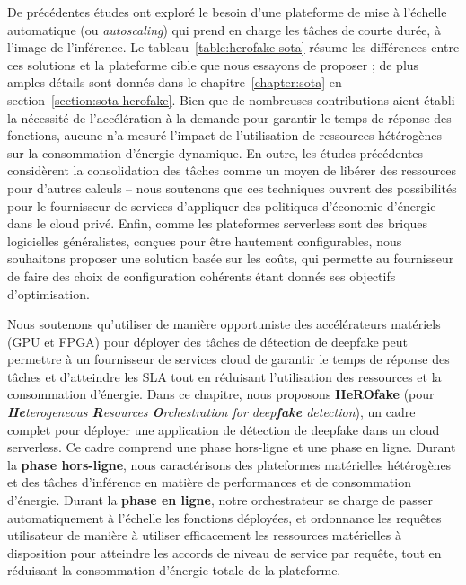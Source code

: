 De précédentes études ont exploré le besoin d'une plateforme de mise à l'échelle automatique (ou \textit{autoscaling}) qui prend en charge les tâches de courte durée, à l'image de l'inférence. Le tableau~\ref{table:herofake-sota} résume les différences entre ces solutions et la plateforme cible que nous essayons de proposer ; de plus amples détails sont donnés dans le chapitre~\ref{chapter:sota} en section~\ref{section:sota-herofake}. Bien que de nombreuses contributions aient établi la nécessité de l'accélération à la demande pour garantir le temps de réponse des fonctions, aucune n'a mesuré l'impact de l'utilisation de ressources hétérogènes sur la consommation d'énergie dynamique. En outre, les études précédentes considèrent la consolidation des tâches comme un moyen de libérer des ressources pour d'autres calculs -- nous soutenons que ces techniques ouvrent des possibilités pour le fournisseur de services d'appliquer des politiques d'économie d'énergie dans le cloud privé. Enfin, comme les plateformes serverless sont des briques logicielles généralistes, conçues pour être hautement configurables, nous souhaitons proposer une solution basée sur les coûts, qui permette au fournisseur de faire des choix de configuration cohérents étant donnés ses objectifs d'optimisation.

Nous soutenons qu'utiliser de manière opportuniste des accélérateurs matériels (GPU et FPGA) pour déployer des tâches de détection de deepfake peut permettre à un fournisseur de services cloud de garantir le temps de réponse des tâches et d'atteindre les SLA tout en réduisant l'utilisation des ressources et la consommation d'énergie. Dans ce chapitre, nous proposons \textbf{HeROfake} (pour \textit{\textbf{He}terogeneous \textbf{R}esources \textbf{O}rchestration for deep\textbf{fake} detection}), un cadre complet pour déployer une application de détection de deepfake dans un cloud serverless. Ce cadre comprend une phase hors-ligne et une phase en ligne. Durant la \textbf{phase hors-ligne}, nous caractérisons des plateformes matérielles hétérogènes et des tâches d'inférence en matière de performances et de consommation d'énergie. Durant la \textbf{phase en ligne}, notre orchestrateur se charge de passer automatiquement à l'échelle les fonctions déployées, et ordonnance les requêtes utilisateur de manière à utiliser efficacement les ressources matérielles à disposition pour atteindre les accords de niveau de service par requête, tout en réduisant la consommation d'énergie totale de la plateforme.

